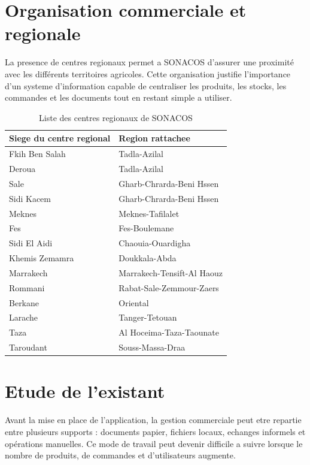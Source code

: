 \documentclass[12pt,a4paper]{report}
\begin{document}
\section{Organisation commerciale et regionale}

La presence de centres regionaux permet a SONACOS d'assurer une proximité avec les différents territoires agricoles. Cette organisation justifie l'importance d'un systeme d'information capable de centraliser les produits, les stocks, les commandes et les documents tout en restant simple a utiliser.

\begin{table}[H]
  \centering
  \caption{Liste des centres regionaux de SONACOS}
  \label{tab:centres-regionaux}
  \begin{tabular}{|p{}|p{}|}
    \hline
    \textbf{Siege du centre regional} & \textbf{Region rattachee} \\
    \hline
    Fkih Ben Salah & Tadla-Azilal \\
    Deroua & Tadla-Azilal \\
    Sale & Gharb-Chrarda-Beni Hssen \\
    Sidi Kacem & Gharb-Chrarda-Beni Hssen \\
    Meknes & Meknes-Tafilalet \\
    Fes & Fes-Boulemane \\
    Sidi El Aidi & Chaouia-Ouardigha \\
    Khemis Zemamra & Doukkala-Abda \\
    Marrakech & Marrakech-Tensift-Al Haouz \\
    Rommani & Rabat-Sale-Zemmour-Zaers \\
    Berkane & Oriental \\
    Larache & Tanger-Tetouan \\
    Taza & Al Hoceima-Taza-Taounate \\
    Taroudant & Souss-Massa-Draa \\
    \hline
  \end{tabular}
\end{table}



\section{Etude de l'existant}

Avant la mise en place de l'application, la gestion commerciale peut etre repartie entre plusieurs supports : documents papier, fichiers locaux, echanges informels et opérations manuelles. Ce mode de travail peut devenir difficile a suivre lorsque le nombre de produits, de commandes et d'utilisateurs augmente.
\end{document}

